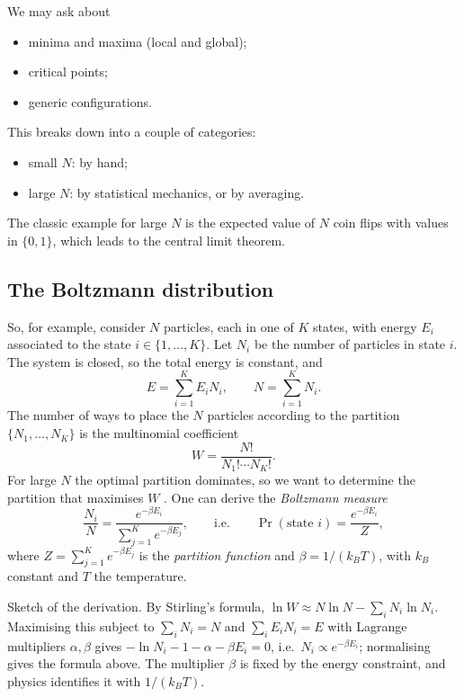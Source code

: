 We may ask about
\begin{itemize}
  \item minima and maxima (local and global);
  \item critical points;
  \item generic configurations.
\end{itemize}
This breaks down into a couple of categories:
\begin{itemize}
  \item small $N$: by hand;
  \item large $N$: by statistical mechanics, or by averaging.
\end{itemize}
The classic example for large $N$ is the expected value of $N$ coin flips with values in
$\{0,1\}$, which leads to the central limit theorem.

\subsection{The Boltzmann distribution}
\label{L07:subsec:boltzmann}

So, for example, consider $N$ particles, each in one of $K$ states, with energy $E_i$
associated to the state $i\in\{1,\dots,K\}$. Let $N_i$ be the number of particles in state
$i$. The system is closed, so the total energy is constant, and
\[
  E=\sum_{i=1}^K E_i N_i, \qquad N=\sum_{i=1}^K N_i .
\]
The number of ways to place the $N$ particles according to the partition
$\{N_1,\dots,N_K\}$ is the multinomial coefficient
\[
  W=\frac{N!}{N_1!\cdots N_K!}.
\]
For large $N$ the optimal partition dominates, so we want to determine the partition that
maximises $W$ . One can derive the
\emph{Boltzmann measure}
\[
  \frac{N_i}{N}=\frac{e^{-\beta E_i}}{\sum_{j=1}^K e^{-\beta E_j}},
  \qquad\text{i.e.}\qquad
  \Pr(\text{state } i)=\frac{e^{-\beta E_i}}{Z},
\]
where $Z=\sum_{j=1}^K e^{-\beta E_j}$ is the \emph{partition function} and
$\beta=1/(k_B T)$, with $k_B$  constant and $T$ the temperature.

\begin{addedblock}
Sketch of the derivation. By Stirling's formula,
$\ln W\approx N\ln N-\sum_i N_i\ln N_i$. Maximising this subject to $\sum_i N_i=N$ and
$\sum_i E_iN_i=E$ with Lagrange multipliers $\alpha,\beta$ gives
$-\ln N_i-1-\alpha-\beta E_i=0$, i.e.\ $N_i\propto e^{-\beta E_i}$; normalising gives the
formula above. The multiplier $\beta$ is fixed by the energy constraint, and physics
identifies it with $1/(k_BT)$.
\end{addedblock}


